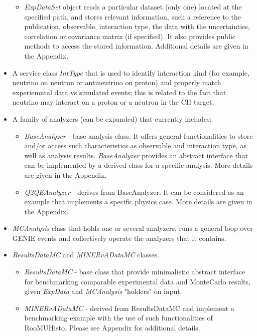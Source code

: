 \begin{itemize}
{\begin{itemize}
{data locatedat the specified path, via the public method ExpData::ReadExpData. It can read/store multiple 
datasets. It also has public access methods to retreive the number of datasets and/or a pointer to a particular 
dataset, by the dataset's serial number of by its name.}
\item{ {\it ExpDataSet} object reads a particular dataset (only one) located at the specified path, and stores
relevant information, such a reference to the publication, observable, interaction type, the data with the 
uncertainties, correlation or covariance matrix (if specified). It also provides public methods to access 
the stored information. Additional details are given in the Appendix.
}
\end{itemize}
}  
\item{A service class {\it IntType} that is used to identify interaction kind (for example, neutrino on 
neutron or antineutrino on proton) and properly match experiemntal data vs simulated events; this is related
to the fact that neutrino may interact on a proton or a neutron in the CH target.}
\item{A family of analyzers (can be expanded) that currently includes: 
\begin{itemize} 
\item{ {\it BaseAnalyzer} - base analysis class. It offers general functionalities to store and/or access
such characteristics as observable and interaction type, as well as analysis results. 
{\it BaseAnalyzer} provides an abstract interface that can be implemented by a derived class for 
a specific analysis. More details are given in the Appendix.
}
\item{ {\it Q2QEAnalyzer} - derives from BaseAnalyzer. It can be considered as an example that implements 
a specific physics case. 
More details are given in the Appendix.}
\end{itemize}
}
\item{ {\it MCAnalysis} class that holds one or several analyzers, runs a general loop over GENIE events and 
collectively operate the analyzers that it contains.}
\item{ {\it ResultsDataMC} and {\it MINERvADataMC} classes.
\begin{itemize}
\item{ {\it ResultsDataMC} - base class that provide minimalistic abstract interface for benchmarking comparable
experimental data and MonteCarlo results, given {\it ExpData} and {\it MCAnalysis} "holders" on input. 
}
\item{ {\it MINERvADataMC} - derived from ResultsDataMC and implement a benchmarking example with the use of
such functionalities of RooMUHisto.
Please see Appendix for additional details.
}
\end{itemize}
}
\end{itemize}

